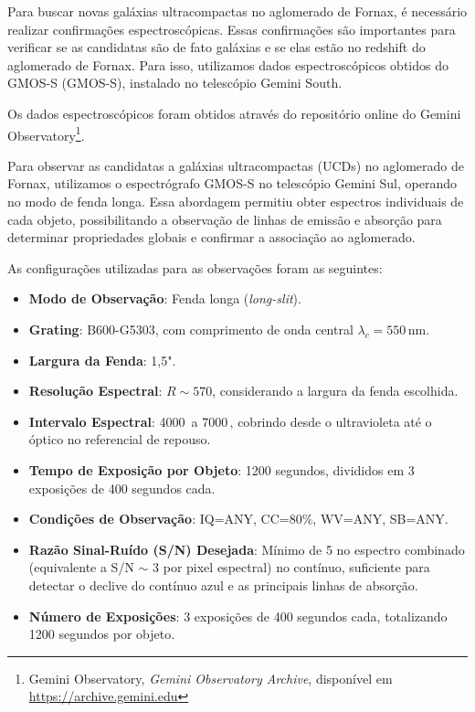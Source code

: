 Para buscar novas galáxias ultracompactas no aglomerado de Fornax, é necessário realizar confirmações espectroscópicas. Essas confirmações são importantes para verificar se as candidatas são de fato galáxias e se elas estão no redshift do aglomerado de Fornax. Para isso, utilizamos dados espectroscópicos obtidos do \ac{GMOS-S} (GMOS-S), instalado no telescópio Gemini South.

Os dados espectroscópicos foram obtidos através do repositório online do Gemini Observatory\footnote{Gemini Observatory, \textit{Gemini Observatory Archive}, disponível em \url{https://archive.gemini.edu}}.

Para observar as candidatas a galáxias ultracompactas (UCDs) no aglomerado de Fornax, utilizamos o espectrógrafo \ac{GMOS-S} no telescópio Gemini Sul, operando no modo de fenda longa. Essa abordagem permitiu obter espectros individuais de cada objeto, possibilitando a observação de linhas de emissão e absorção para determinar propriedades globais e confirmar a associação ao aglomerado.

As configurações utilizadas para as observações foram as seguintes:

\begin{itemize}
    \item \textbf{Modo de Observação}: Fenda longa (\textit{long-slit}).
    \item \textbf{Grating}: B600-G5303, com comprimento de onda central $\lambda_c = 550 \, \text{nm}$.
    \item \textbf{Largura da Fenda}: 1,5".
    \item \textbf{Resolução Espectral}: $R \sim 570$, considerando a largura da fenda escolhida.
    \item \textbf{Intervalo Espectral}: 4000\, a 7000\,, cobrindo desde o ultravioleta até o óptico no referencial de repouso.
    \item \textbf{Tempo de Exposição por Objeto}: 1200 segundos, divididos em 3 exposições de 400 segundos cada.
    \item \textbf{Condições de Observação}: IQ=ANY, CC=80\%, WV=ANY, SB=ANY.
    \item \textbf{Razão Sinal-Ruído (S/N) Desejada}: Mínimo de 5 no espectro combinado (equivalente a S/N $\sim$ 3 por pixel espectral) no contínuo, suficiente para detectar o declive do contínuo azul e as principais linhas de absorção.
    \item \textbf{Número de Exposições}: 3 exposições de 400 segundos cada, totalizando 1200 segundos por objeto.
\end{itemize}

